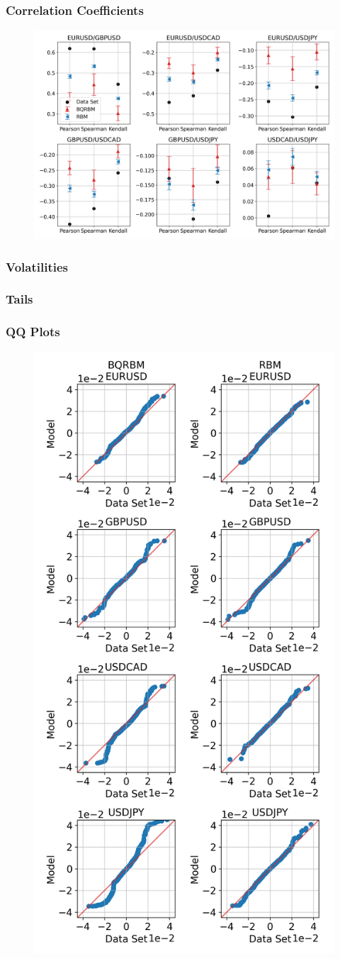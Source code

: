 \documentclass{beamer}
\begin{document}
\begin{frame}
    \frametitle{Correlation Coefficients}
    \begin{figure}
        \includegraphics[width=0.9\linewidth]{qbm/log_returns/correlation_coefficients.png}
    \end{figure}
\end{frame}

\begin{frame}
    \frametitle{Volatilities}
    \begin{table}[!htb]
        \centering
        \begin{adjustbox}{max width=\textwidth}
            
        \end{adjustbox}
    \end{table}
\end{frame}

\begin{frame}
    \frametitle{Tails}
    \begin{table}[!htb]
        \centering
        \begin{adjustbox}{max height=35mm}
            
        \end{adjustbox}
    \end{table}
\end{frame}

\begin{frame}
    \frametitle{QQ Plots}
    \begin{figure}
        \includegraphics[width=0.3\linewidth]{qbm/log_returns/qq.png}
    \end{figure}
\end{frame}
\end{document}
